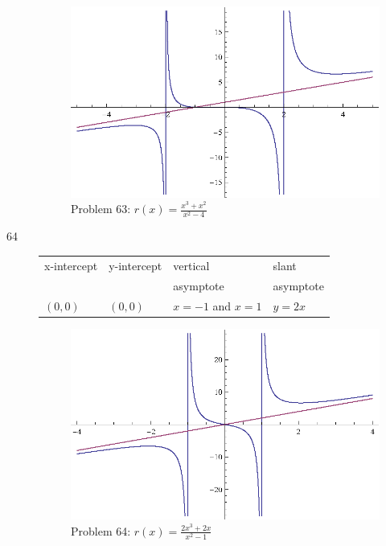 \documentclass{exam}
\begin{document}
\begin{description}
      \begin{figure}[H]
        \centering
        \includegraphics[scale = 0.8]{problem63.eps}
        \caption*{ Problem 63: $r(x) = \frac{x^3 + x^2}{x^2 - 4}$ }
      \end{figure}

    \item[64]
      \begin{tabular}{llll}
        \toprule
        x-intercept & y-intercept & vertical    & slant \\
                    &             & asymptote   & asymptote \\
        \midrule
        $(0, 0)$    & $(0, 0)$    & $x = -1$ and $x = 1$ & $y = 2x$ \\
        \bottomrule
      \end{tabular}

      \begin{figure}[H]
        \centering
        \includegraphics[scale = 0.8]{problem64.eps}
        \caption*{ Problem 64: $r(x) = \frac{2x^3 + 2x}{x^2 - 1}$ }
      \end{figure}


\end{description}
\end{document}
